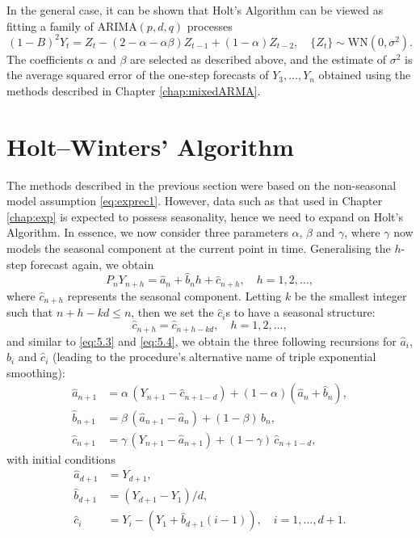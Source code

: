 \documentclass[a4paper, oneside]{discothesis}
\begin{document}
In the general case, it can be shown that Holt's Algorithm can be viewed as fitting a family of $\mathrm{ARIMA}(p,d,q)$ processes
\begin{equation}\label{eq:5.9}
    (1-B)^2Y_t = Z_t - (2 - \alpha - \alpha \beta) Z_{t-1} + (1-\alpha) Z_{t-2}, \quad \{Z_t\} \sim \mathrm{WN}(0, \sigma^2).
\end{equation}
The coefficients $\alpha$ and $\beta$ are selected as described above, and the estimate of $\sigma^2$ is the average squared error of the one-step forecasts of $Y_3, \dots, Y_n$ obtained using the methods described in Chapter \ref{chap:mixedARMA}.


\section{Holt--Winters' Algorithm}
The methods described in the previous section were based on the non-seasonal model assumption \eqref{eq:exprec1}. However, data such as that used in Chapter \ref{chap:exp} is expected to possess seasonality, hence we need to expand on Holt's Algorithm. In essence, we now consider three parameters $\alpha$, $\beta$ and $\gamma$, where $\gamma$ now models the seasonal component at the current point in time. Generalising the $h$-step forecast again, we obtain
\begin{equation}\label{eq:HW}
    P_n Y_{n+h} = \hat{a}_n + \hat{b}_n h + \hat{c}_{n+h}, \quad h=1, 2, \dots,
\end{equation}
where $\hat{c}_{n+h}$ represents the seasonal component. Letting $k$ be the smallest integer such that $n+h-kd \leq n$, then we set the $\hat{c}_i$s to have a seasonal structure:
\begin{equation*}
    \hat{c}_{n+h} = \hat{c}_{n+h-kd}, \quad h=1, 2, \dots,
\end{equation*}
and similar to \eqref{eq:5.3} and \eqref{eq:5.4}, we obtain the three following recursions for $\hat{a}_i$, $\hat{b}_i$ and $\hat{c}_i$ (leading to the procedure's alternative name of triple exponential smoothing):
\begin{align*}
    \hat{a}_{n+1} &= \alpha\, (Y_{n+1} - \hat{c}_{n+1-d}) + (1-\alpha)(\hat{a}_n + \hat{b}_n), \\
    \hat{b}_{n+1} &= \beta\, (\hat{a}_{n+1} - \hat{a}_n) + (1-\beta)\,\hat{b}_n, \\
    \hat{c}_{n+1} &= \gamma\, (Y_{n+1} - \hat{a}_{n+1}) + (1-\gamma)\,\hat{c}_{n+1-d},
\end{align*}
with initial conditions
\begin{align*}
    \hat{a}_{d+1} &= Y_{d+1}, \\
    \hat{b}_{d+1} &= (Y_{d+1}- Y_1) /d, \\
    \hat{c}_i &= Y_i - (Y_1 + \hat{b}_{d+1}(i-1)), \quad i = 1, \dots, d+1.
\end{align*}
\end{document}

